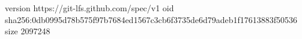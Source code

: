 version https://git-lfs.github.com/spec/v1
oid sha256:0db0995d78b575f97b7684ed1567c3cb6f3735de6d79adeb1f17613883f50536
size 2097248
